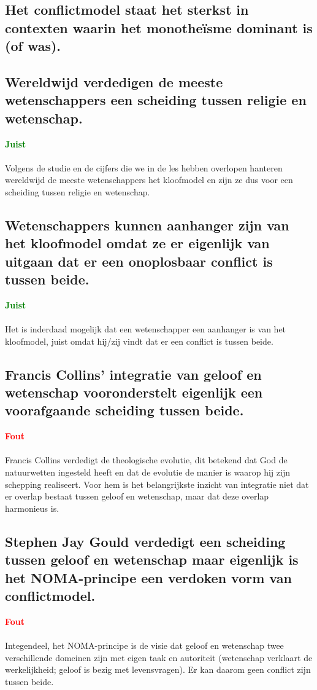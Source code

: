 \documentclass[11pt,a4paper,titlepage]{article}
\begin{document}
\subsection{Het conflictmodel staat het sterkst in contexten waarin het monotheïsme dominant is (of was).}

\subsection{Wereldwijd verdedigen de meeste wetenschappers een scheiding tussen religie en wetenschap.}
\textcolor{green}{\textbf{Juist}}\\\\
Volgens de studie en de cijfers die we in de les hebben overlopen hanteren wereldwijd de meeste wetenschappers het kloofmodel en zijn ze dus voor een scheiding tussen religie en wetenschap.

\subsection{Wetenschappers kunnen aanhanger zijn van het kloofmodel omdat ze er eigenlijk van uitgaan dat er een onoplosbaar conflict is tussen beide.}
\textcolor{green}{\textbf{Juist}}\\\\
Het is inderdaad mogelijk dat een wetenschapper een aanhanger is van het kloofmodel, juist omdat hij/zij vindt dat er een conflict is tussen beide.

\subsection{Francis Collins’ integratie van geloof en wetenschap vooronderstelt eigenlijk een voorafgaande scheiding tussen beide.}
\textcolor{red}{\textbf{Fout}}\\\\
Francis Collins verdedigt de theologische evolutie, dit betekend dat God de natuurwetten ingesteld heeft en dat de evolutie de manier is waarop hij zijn schepping realiseert.  Voor hem is het belangrijkste inzicht van integratie niet dat er overlap bestaat tussen geloof en wetenschap, maar dat deze overlap harmonieus is.

\subsection{Stephen Jay Gould verdedigt een scheiding tussen geloof en wetenschap maar eigenlijk is het NOMA-principe een verdoken vorm van conflictmodel.}
\textcolor{red}{\textbf{Fout}}\\\\
Integendeel, het NOMA-principe is de visie dat geloof en wetenschap twee verschillende domeinen zijn met eigen taak en autoriteit (wetenschap verklaart de werkelijkheid; geloof is bezig met levensvragen). Er kan daarom geen conflict zijn tussen beide.
\end{document}

